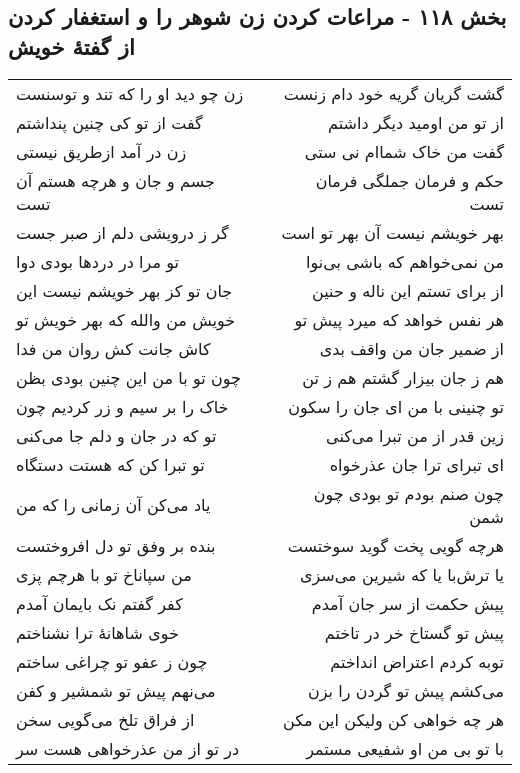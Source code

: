 \begin{center}
\section*{بخش ۱۱۸ - مراعات کردن زن شوهر را و استغفار کردن از گفتهٔ خویش}
\label{sec:sh118}
\begin{longtable}{l p{0.5cm} r}
زن چو دید او را که تند و توسنست
&&
گشت گریان گریه خود دام زنست
\\
گفت از تو کی چنین پنداشتم
&&
از تو من اومید دیگر داشتم
\\
زن در آمد ازطریق نیستی
&&
گفت من خاک شماام نی ستی
\\
جسم و جان و هرچه هستم آن تست
&&
حکم و فرمان جملگی فرمان تست
\\
گر ز درویشی دلم از صبر جست
&&
بهر خویشم نیست آن بهر تو است
\\
تو مرا در دردها بودی دوا
&&
من نمی‌خواهم که باشی بی‌نوا
\\
جان تو کز بهر خویشم نیست این
&&
از برای تستم این ناله و حنین
\\
خویش من والله که بهر خویش تو
&&
هر نفس خواهد که میرد پیش تو
\\
کاش جانت کش روان من فدا
&&
از ضمیر جان من واقف بدی
\\
چون تو با من این چنین بودی بظن
&&
هم ز جان بیزار گشتم هم ز تن
\\
خاک را بر سیم و زر کردیم چون
&&
تو چنینی با من ای جان را سکون
\\
تو که در جان و دلم جا می‌کنی
&&
زین قدر از من تبرا می‌کنی
\\
تو تبرا کن که هستت دستگاه
&&
ای تبرای ترا جان عذرخواه
\\
یاد می‌کن آن زمانی را که من
&&
چون صنم بودم تو بودی چون شمن
\\
بنده بر وفق تو دل افروختست
&&
هرچه گویی پخت گوید سوختست
\\
من سپاناخ تو با هرچم پزی
&&
یا ترش‌با یا که شیرین می‌سزی
\\
کفر گفتم نک بایمان آمدم
&&
پیش حکمت از سر جان آمدم
\\
خوی شاهانهٔ ترا نشناختم
&&
پیش تو گستاخ خر در تاختم
\\
چون ز عفو تو چراغی ساختم
&&
توبه کردم اعتراض انداختم
\\
می‌نهم پیش تو شمشیر و کفن
&&
می‌کشم پیش تو گردن را بزن
\\
از فراق تلخ می‌گویی سخن
&&
هر چه خواهی کن ولیکن این مکن
\\
در تو از من عذرخواهی هست سر
&&
با تو بی من او شفیعی مستمر
\\

\end{longtable}
\end{center}
